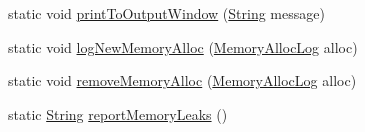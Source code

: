 \begin{DoxyCompactItemize}
static void \mbox{\hyperlink{class_rad_j_a_v_1_1_rad_jav_aa06bae2f115631a90a2426d818499049}{print\+To\+Output\+Window}} (\mbox{\hyperlink{class_rad_j_a_v_1_1_string}{String}} message)
\item 
static void \mbox{\hyperlink{class_rad_j_a_v_1_1_rad_jav_a0f461b48e84744a69df4ff30dbf7d302}{log\+New\+Memory\+Alloc}} (\mbox{\hyperlink{class_rad_j_a_v_1_1_memory_alloc_log}{Memory\+Alloc\+Log}} alloc)
\item 
static void \mbox{\hyperlink{class_rad_j_a_v_1_1_rad_jav_a6226fe15f13446edc493596b6c029cb7}{remove\+Memory\+Alloc}} (\mbox{\hyperlink{class_rad_j_a_v_1_1_memory_alloc_log}{Memory\+Alloc\+Log}} alloc)
\item 
static \mbox{\hyperlink{class_rad_j_a_v_1_1_string}{String}} \mbox{\hyperlink{class_rad_j_a_v_1_1_rad_jav_a26e6e428425568f87a7ac59e2eef5359}{report\+Memory\+Leaks}} ()
\end{DoxyCompactItemize}

